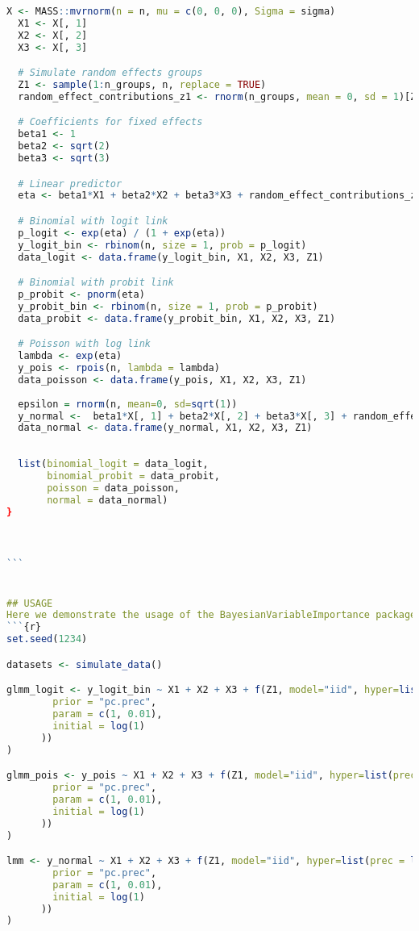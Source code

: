 \begin{lstlisting}[language=R, caption=Usage of the BayesianImpGLMM package with plots and examples.]
  X <- MASS::mvrnorm(n = n, mu = c(0, 0, 0), Sigma = sigma)
  X1 <- X[, 1]
  X2 <- X[, 2]
  X3 <- X[, 3]

  # Simulate random effects groups
  Z1 <- sample(1:n_groups, n, replace = TRUE)
  random_effect_contributions_z1 <- rnorm(n_groups, mean = 0, sd = 1)[Z1]

  # Coefficients for fixed effects
  beta1 <- 1
  beta2 <- sqrt(2)
  beta3 <- sqrt(3)

  # Linear predictor
  eta <- beta1*X1 + beta2*X2 + beta3*X3 + random_effect_contributions_z1 

  # Binomial with logit link
  p_logit <- exp(eta) / (1 + exp(eta))
  y_logit_bin <- rbinom(n, size = 1, prob = p_logit)
  data_logit <- data.frame(y_logit_bin, X1, X2, X3, Z1)

  # Binomial with probit link
  p_probit <- pnorm(eta)
  y_probit_bin <- rbinom(n, size = 1, prob = p_probit)
  data_probit <- data.frame(y_probit_bin, X1, X2, X3, Z1)

  # Poisson with log link
  lambda <- exp(eta)
  y_pois <- rpois(n, lambda = lambda)
  data_poisson <- data.frame(y_pois, X1, X2, X3, Z1)
  
  epsilon = rnorm(n, mean=0, sd=sqrt(1))
  y_normal <-  beta1*X[, 1] + beta2*X[, 2] + beta3*X[, 3] + random_effect_contributions_z1 + epsilon 
  data_normal <- data.frame(y_normal, X1, X2, X3, Z1)
  
  
  list(binomial_logit = data_logit, 
       binomial_probit = data_probit, 
       poisson = data_poisson, 
       normal = data_normal)
}



```


## USAGE
Here we demonstrate the usage of the BayesianVariableImportance package. We fit Bayesian binomial, Poisson and gaussian models and sample posterior distributions for different simulated datasets using functions from the package. Then, plots are made to display the results.
```{r}
set.seed(1234)

datasets <- simulate_data()

glmm_logit <- y_logit_bin ~ X1 + X2 + X3 + f(Z1, model="iid", hyper=list(prec = list(
        prior = "pc.prec",
        param = c(1, 0.01),
        initial = log(1)
      ))
)

glmm_pois <- y_pois ~ X1 + X2 + X3 + f(Z1, model="iid", hyper=list(prec = list(
        prior = "pc.prec",
        param = c(1, 0.01),
        initial = log(1)
      ))
)

lmm <- y_normal ~ X1 + X2 + X3 + f(Z1, model="iid", hyper=list(prec = list(
        prior = "pc.prec",
        param = c(1, 0.01),
        initial = log(1)
      ))
)
    

\end{lstlisting}
